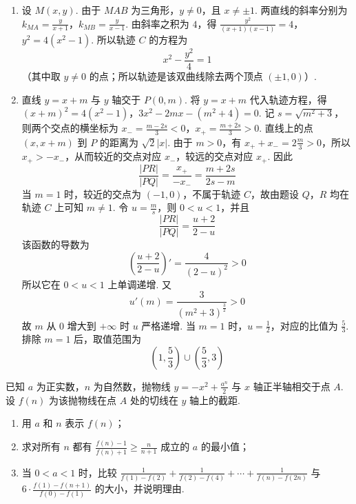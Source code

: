 \begin{solution}
\begin{enumerate}
\item 设 \(M(x,y)\). 由于 \(MAB\) 为三角形，\(y\ne0\)，且 \(x\ne\pm1\). 两直线的斜率分别为
\(k_{MA}=\frac{y}{x+1}\)，\(k_{MB}=\frac{y}{x-1}\).
由斜率之积为 \(4\)，得
\(\frac{y^2}{(x+1)(x-1)}=4\)，\(y^2=4(x^2-1)\).
所以轨迹 \(C\) 的方程为
\[
x^2-\frac{y^2}{4}=1
\]
（其中取 \(y\ne0\) 的点；所以轨迹是该双曲线除去两个顶点 \((\pm1,0)\)）.
\item 直线 \(y=x+m\) 与 \(y\) 轴交于 \(P(0,m)\). 将 \(y=x+m\) 代入轨迹方程，得
\((x+m)^2=4(x^2-1)\)，\(3x^2-2mx-(m^2+4)=0\).
记 \(s=\sqrt{m^2+3}\)，则两个交点的横坐标为
\(x_-=\frac{m-2s}{3}<0\)，\(x_+=\frac{m+2s}{3}>0\).
直线上的点 \((x,x+m)\) 到 \(P\) 的距离为 \(\sqrt2|x|\). 由于 \(m>0\)，有 \(x_++x_-=2\frac{m}{3}>0\)，所以 \(x_+>-x_-\)，从而较近的交点对应 \(x_-\)，较远的交点对应 \(x_+\). 因此
\[
\frac{|PR|}{|PQ|}
=\frac{x_+}{-x_-}
=\frac{m+2s}{2s-m}
\]
当 \(m=1\) 时，较近的交点为 \((-1,0)\)，不属于轨迹 \(C\)，故由题设 \(Q\)，\(R\) 均在轨迹 \(C\) 上可知 \(m\ne1\).
令 \(u=\frac{m}{s}\)，则 \(0<u<1\)，并且
\[
\frac{|PR|}{|PQ|}=\frac{u+2}{2-u}
\]
该函数的导数为
\[
\left(\frac{u+2}{2-u}\right)'=\frac4{(2-u)^2}>0
\]
所以它在 \(0<u<1\) 上单调递增. 又
\[
u'(m)=\frac3{(m^2+3)^{\frac{3}{2}}}>0
\]
故 \(m\) 从 \(0\) 增大到 \(+\infty\) 时 \(u\) 严格递增. 当 \(m=1\) 时，\(u=\frac12\)，对应的比值为 \(\frac53\). 排除 \(m=1\) 后，取值范围为
\[
\left(1,\frac53\right)\cup\left(\frac53,3\right)
\]
\end{enumerate}
\end{solution}

\begin{problem}
已知 \(a\) 为正实数，\(n\) 为自然数，抛物线 \(y = -x^{2} + \frac{a^{n}}{2}\) 与 \(x\) 轴正半轴相交于点 \(A\). 设 \(f(n)\) 为该抛物线在点 \(A\) 处的切线在 \(y\) 轴上的截距.
\begin{enumerate}
\item 用 \(a\) 和 \(n\) 表示 \( f(n) \)；
\item 求对所有 \(n\) 都有 \(\frac{f(n) - 1}{f(n) + 1} \geqslant \frac{n}{n + 1}\) 成立的 \(a\) 的最小值；
\item 当 \(0 < a < 1\) 时，比较 \(\frac{1}{f(1) - f(2)} + \frac{1}{f(2) - f(4)} + \cdots + \frac{1}{f(n) - f(2n)}\) 与 \(6 \cdot \frac{f(1) - f(n + 1)}{f(0) - f(1)}\) 的大小，并说明理由.
\end{enumerate}
\end{problem}

